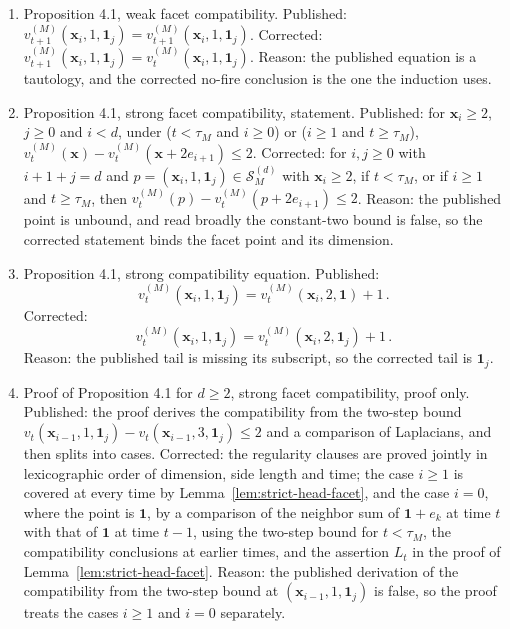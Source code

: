 \documentclass[12pt]{amsart}
\begin{document}
\begin{enumerate}
\item[C15.] Proposition 4.1, weak facet compatibility. Published: $v_{t+1}^{(M)}(\mathbf{x}_i, 1, \mathbf{1}_j) = v_{t+1}^{(M)}(\mathbf{x}_i, 1, \mathbf{1}_j)$. Corrected: $v_{t+1}^{(M)}(\mathbf{x}_i, 1, \mathbf{1}_j) = v_t^{(M)}(\mathbf{x}_i, 1, \mathbf{1}_j)$. Reason: the published equation is a tautology, and the corrected no-fire conclusion is the one the induction uses.
\item[C16.] Proposition 4.1, strong facet compatibility, statement. Published: for $\mathbf{x}_i \geq 2$, $j \geq 0$ and $i < d$, under ($t < \tau_M$ and $i \geq 0$) or ($i \geq 1$ and $t \geq \tau_M$), $v_t^{(M)}(\mathbf{x}) - v_t^{(M)}(\mathbf{x} + 2 e_{i+1}) \leq 2$. Corrected: for $i, j \geq 0$ with $i + 1 + j = d$ and $p = (\mathbf{x}_i, 1, \mathbf{1}_j) \in \mathcal S_M^{(d)}$ with $\mathbf{x}_i \geq 2$, if $t < \tau_M$, or if $i \geq 1$ and $t \geq \tau_M$, then $v_t^{(M)}(p) - v_t^{(M)}(p + 2 e_{i+1}) \leq 2$. Reason: the published point is unbound, and read broadly the constant-two bound is false, so the corrected statement binds the facet point and its dimension.
\item[C17.] Proposition 4.1, strong compatibility equation. Published:
\begin{equation*}
v_t^{(M)}(\mathbf{x}_i, 1, \mathbf{1}_j) = v_t^{(M)}(\mathbf{x}_i, 2, \mathbf{1}) + 1\,.
\end{equation*}
Corrected:
\begin{equation*}
v_t^{(M)}(\mathbf{x}_i, 1, \mathbf{1}_j) = v_t^{(M)}(\mathbf{x}_i, 2, \mathbf{1}_j) + 1\,.
\end{equation*}
Reason: the published tail is missing its subscript, so the corrected tail is $\mathbf{1}_j$.
\item[C18.] Proof of Proposition 4.1 for $d \geq 2$, strong facet compatibility, proof only. Published: the proof derives the compatibility from the two-step bound $v_t(\mathbf{x}_{i-1}, 1, \mathbf{1}_j) - v_t(\mathbf{x}_{i-1}, 3, \mathbf{1}_j) \leq 2$ and a comparison of Laplacians, and then splits into cases. Corrected: the regularity clauses are proved jointly in lexicographic order of dimension, side length and time; the case $i\geq1$ is covered at every time by Lemma~\ref{lem:strict-head-facet}, and the case $i=0$, where the point is $\mathbf 1$, by a comparison of the neighbor sum of $\mathbf 1+e_k$ at time $t$ with that of $\mathbf 1$ at time $t-1$, using the two-step bound for $t<\tau_M$, the compatibility conclusions at earlier times, and the assertion $L_t$ in the proof of Lemma~\ref{lem:strict-head-facet}. Reason: the published derivation of the compatibility from the two-step bound at $(\mathbf x_{i-1}, 1, \mathbf 1_j)$ is false, so the proof treats the cases $i\geq1$ and $i=0$ separately.

\end{enumerate}
\end{document}

